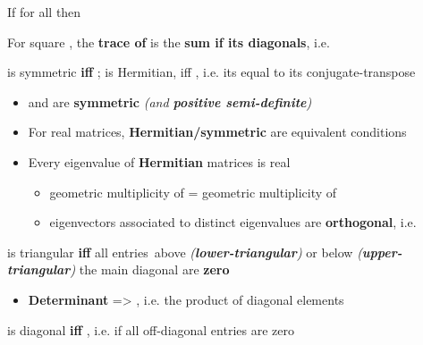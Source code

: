 If  for all  then 

For square , the \textbf{trace of } is the
\textbf{sum if its diagonals}, i.e. 

\hSep %

 is symmetric \textbf{iff} ;  is Hermitian, iff , i.e. its equal
to its conjugate-transpose

\begin{itemize}

      \item
             and  are \textbf{symmetric} \emph{(and
                  \textbf{positive semi-definite})}
      \item
            For real matrices, \textbf{Hermitian/symmetric} are equivalent
            conditions
      \item
            Every eigenvalue  of \textbf{Hermitian} matrices
            is real

            \begin{itemize}

                  \item
                        geometric multiplicity of  = geometric multiplicity of 
                  \item
                        eigenvectors  associated
                        to distinct eigenvalues  are
                        \textbf{orthogonal},
                        i.e.~
            \end{itemize}
\end{itemize}

\hSep %

 is triangular \textbf{iff} all entries~above
\emph{(\textbf{lower-triangular})} or below
\emph{(\textbf{upper-triangular})} the main diagonal are \textbf{zero}

\begin{itemize}
      \item
            \textbf{Determinant} =>
            , i.e. the product of
            diagonal elements
\end{itemize}

\hSep %

 is diagonal \textbf{iff} ,
i.e. if all off-diagonal entries are zero

